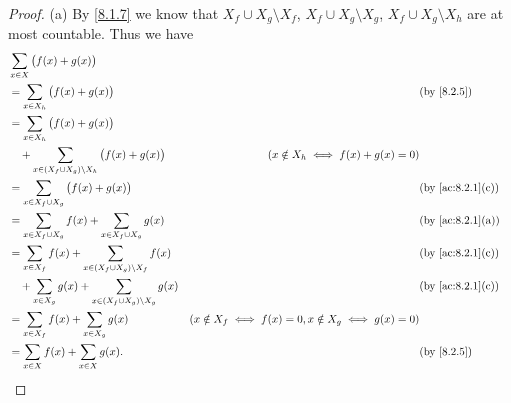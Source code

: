 \begin{proof}{(a)}
  By \cref{8.1.7} we know that \(X_f \cup X_g \setminus X_f\), \(X_f \cup X_g \setminus X_g\), \(X_f \cup X_g \setminus X_h\) are at most countable.
  Thus we have
  \begin{align*}
     & \sum_{x \in X} \big(f(x) + g(x)\big)                                                                                                                                       \\
     & = \sum_{x \in X_h} \big(f(x) + g(x)\big)                                       &                                                          & \by{8.2.5}                     \\
     & = \sum_{x \in X_h} \big(f(x) + g(x)\big)                                                                                                                                   \\
     & \quad + \sum_{x \in (X_f \cup X_g) \setminus X_h} \big(f(x) + g(x)\big)        & (x \notin X_h \iff f(x) + g(x) = 0)                                                       \\
     & = \sum_{x \in X_f \cup X_g} \big(f(x) + g(x)\big)                              &                                                          & \text{(by \cref{ac:8.2.1}(c))} \\
     & = \sum_{x \in X_f \cup X_g} f(x) + \sum_{x \in X_f \cup X_g} g(x)              &                                                          & \text{(by \cref{ac:8.2.1}(a))} \\
     & = \sum_{x \in X_f} f(x) + \sum_{x \in (X_f \cup X_g) \setminus X_f} f(x)       &                                                          & \text{(by \cref{ac:8.2.1}(c))} \\
     & \quad + \sum_{x \in X_g} g(x) + \sum_{x \in (X_f \cup X_g) \setminus X_g} g(x) &                                                          & \text{(by \cref{ac:8.2.1}(c))} \\
     & = \sum_{x \in X_f} f(x) + \sum_{x \in X_g} g(x)                                & (x \notin X_f \iff f(x) = 0, x \notin X_g \iff g(x) = 0)                                  \\
     & = \sum_{x \in X} f(x) + \sum_{x \in X} g(x).                                   &                                                          & \by{8.2.5}
  \end{align*}
\end{proof}

